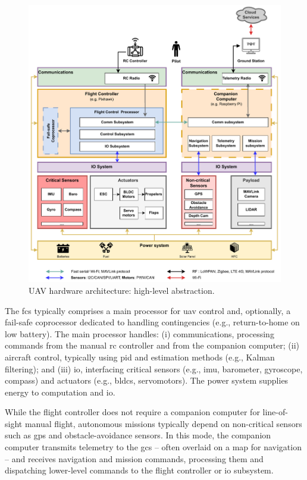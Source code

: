 \begin{figure}[!hbt]
  \centering
  \includegraphics[width=\textwidth]{./img/pdf/uav-hw-arch.pdf}
  \caption{UAV hardware architecture: high-level abstraction.}
  \label{fig:uav-hw-arch}
\end{figure}

The \gls{fcs} typically comprises a main processor for \gls{uav} control and, optionally, a fail-safe coprocessor dedicated to handling contingencies (e.g., return-to-home on low battery). 
The main processor handles: (i) communications, processing commands from the manual \gls{rc} controller and from the companion computer; 
(ii) aircraft control, typically using \gls{pid} and estimation methods (e.g., Kalman filtering); and 
(iii) \gls{io}, interfacing critical sensors (e.g., \gls{imu}, barometer, gyroscope, compass) and actuators (e.g., \glspl{bldc}, servomotors). 
The power system supplies energy to computation and \gls{io}.

While the flight controller does not require a companion computer for line-of-sight manual flight, autonomous missions typically depend on non-critical sensors such as \gls{gps} and obstacle-avoidance sensors. 
In this mode, the companion computer transmits telemetry to the \gls{gcs} -- often
overlaid on a map for navigation -- and receives navigation and mission commands,
processing them and dispatching lower-level commands to the flight controller or
\gls{io} subsystem.

